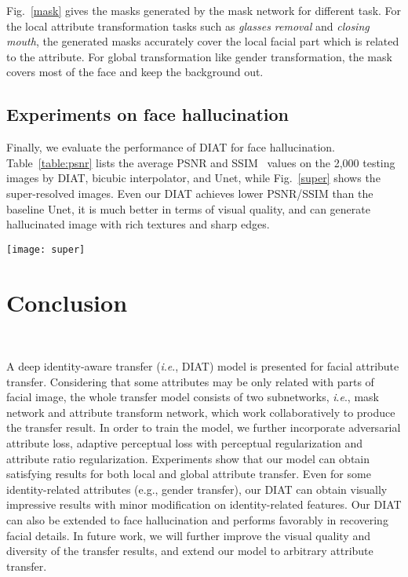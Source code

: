 \documentclass[journal]{IEEEtran}
\newcommand{\ie}{\textit{i}.\textit{e}.}
\begin{document}
Fig.~\ref{mask} gives the masks generated by the mask network for different task. For the local attribute transformation tasks such as \textit{glasses removal} and \textit{closing mouth}, the generated masks accurately cover the local facial part which is related to the attribute. For global transformation like gender transformation, the mask covers most of the face and keep the background out.

\subsection{Experiments on face hallucination}

Finally, we evaluate the performance of DIAT for  face hallucination.
Table~\ref{table:psnr} lists the average PSNR and SSIM~\cite{wang2003ssim} values on the 2,000 testing images by DIAT, bicubic interpolator, and Unet, while Fig.~\ref{super} shows the super-resolved images.
Even our DIAT achieves lower PSNR/SSIM than the baseline Unet, it is much better in terms of visual quality, and can generate hallucinated image with rich textures and sharp edges.

\begin{figure*}
\begin{center}
\texttt{[image: super]}
\end{center}
   \caption{Results of face hallucination by different methods.}
\label{super}
\end{figure*}







\section{Conclusion}
~\label{sec:conclusion}

A deep identity-aware transfer (\ie, DIAT) model is presented for facial attribute transfer.
Considering that some attributes may be only related with parts of facial image, the whole transfer model consists of two subnetworks, \ie, mask network and attribute transform network, which work collaboratively to produce the transfer result.
In order to train the model, we further incorporate adversarial attribute loss, adaptive perceptual loss with perceptual regularization and attribute ratio regularization.
Experiments show that our model can obtain satisfying results for both local and global attribute transfer.
Even for some identity-related attributes (e.g., gender transfer), our DIAT can obtain visually impressive results with minor modification on identity-related features.
Our DIAT can also be extended to face hallucination and performs favorably in recovering facial details.
In future work, we will further improve the visual quality and diversity of the transfer results, and extend our model to arbitrary attribute transfer.













\ifCLASSOPTIONcaptionsoff
  \newpage
\fi











\end{document}
